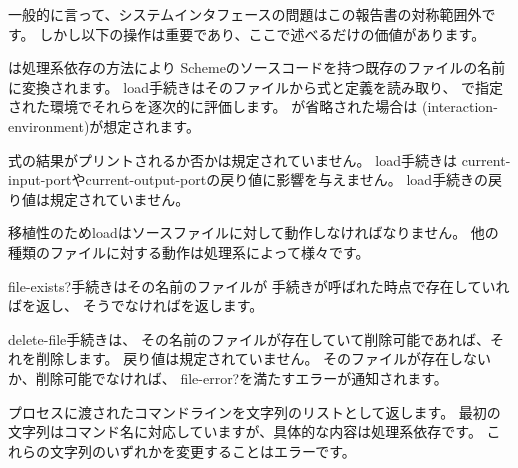 一般的に言って、システムインタフェースの問題はこの報告書の対称範囲外です。
しかし以下の操作は重要であり、ここで述べるだけの価値があります。


\begin{entry}{%
}

は処理系依存の方法により
Schemeのソースコードを持つ既存のファイルの名前に変換されます。
{\cf load}手続きはそのファイルから式と定義を読み取り、
で指定された環境でそれらを逐次的に評価します。
が省略された場合は
{\cf (interaction-environment)}が想定されます。

式の結果がプリントされるか否かは規定されていません。
{\cf load}手続きは
{\cf current-\+input-\+port}や{\cf current-\+output-\+port}の戻り値に影響を与えません。
{\cf load}手続きの戻り値は規定されていません。


\begin{rationale}
移植性のため{\cf load}はソースファイルに対して動作しなければなりません。
他の種類のファイルに対する動作は処理系によって様々です。
\end{rationale}
\end{entry}

\begin{entry}{%
}

{\cf file-exists?}手続きはその名前のファイルが
手続きが呼ばれた時点で存在していれば\schtrue{}を返し、
そうでなければ\schfalse{}を返します。

\end{entry}

\begin{entry}{%
}

{\cf delete-file}手続きは、
その名前のファイルが存在していて削除可能であれば、それを削除します。
戻り値は規定されていません。
そのファイルが存在しないか、削除可能でなければ、
{\cf file-error?}を満たすエラーが通知されます。

\end{entry}

\begin{entry}{%
}

プロセスに渡されたコマンドラインを文字列のリストとして返します。
最初の文字列はコマンド名に対応していますが、具体的な内容は処理系依存です。
これらの文字列のいずれかを変更することはエラーです。
\end{entry}

